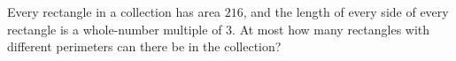Every rectangle in a collection has area $216$, and the length of every side of every rectangle is a whole-number multiple of $3$. At most how many rectangles with different perimeters can there be in the collection?

